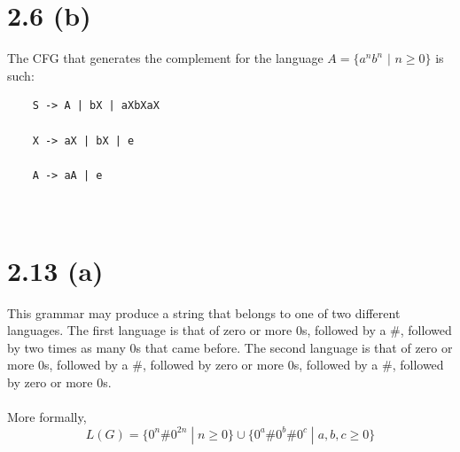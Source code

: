 \documentclass{article}
\begin{document}
\newpage

\section*{2.6 (b)}
The CFG that generates the complement for the language $A = \{a^nb^n$ $\mid$ $n \geq 0\}$ is such:
    
\begin{center}
    
    \begin{lstlisting}
    S -> A | bX | aXbXaX
    
    X -> aX | bX | e
    
    A -> aA | e
    
    
    \end{lstlisting}
    
\end{center}

\section*{2.13 (a)}

This grammar may produce a string that belongs to one of two different languages. The first language is that of zero or more $0$s, followed by a $\#$, followed by two times as many $0$s that came before. The second language is that of zero or more $0$s, followed by a $\#$, followed by zero or more $0$s, followed by a $\#$, followed by zero or more $0$s.\\\\
More formally,
$$L(G) = \{ 0^n\#0^{2n} \; | \; n \geq 0 \} \cup  \{ 0^a\#0^b\#0^c \; | \; a,b,c \geq 0 \}$$
\end{document}
